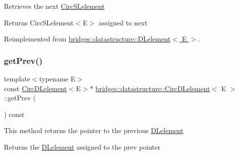 Retrieves the next \hyperlink{classbridges_1_1datastructure_1_1_circ_s_lelement}{Circ\+S\+Lelement} \begin{DoxyReturn}{Returns}
Circ\+S\+Lelement$<$\+E$>$ assigned to next 
\end{DoxyReturn}


Reimplemented from \hyperlink{classbridges_1_1datastructure_1_1_d_lelement_a63212051ea77d74bd751dea00288d2be}{bridges\+::datastructure\+::\+D\+Lelement$<$ E $>$}.

\mbox{\label{classbridges_1_1datastructure_1_1_circ_d_lelement_a7176c3ca8347d8d9324a86265c7d6f84}} 
\subsubsection{\texorpdfstring{get\+Prev()}{getPrev()}}
{\footnotesize\ttfamily template$<$typename E$>$ \\
const \hyperlink{classbridges_1_1datastructure_1_1_circ_d_lelement}{Circ\+D\+Lelement}$<$E$>$$\ast$ \hyperlink{classbridges_1_1datastructure_1_1_circ_d_lelement}{bridges\+::datastructure\+::\+Circ\+D\+Lelement}$<$ E $>$\+::get\+Prev (\begin{DoxyParamCaption}{ }\end{DoxyParamCaption}) const\hspace{0.3cm}{\ttfamily [inline]}}

This method returns the pointer to the previous \hyperlink{classbridges_1_1datastructure_1_1_d_lelement}{D\+Lelement} \begin{DoxyReturn}{Returns}
the \hyperlink{classbridges_1_1datastructure_1_1_d_lelement}{D\+Lelement} assigned to the prev pointer 
\end{DoxyReturn}
\mbox{\label{classbridges_1_1datastructure_1_1_circ_d_lelement_aa19f430c7b00a6d38187021255f741e4}} 
